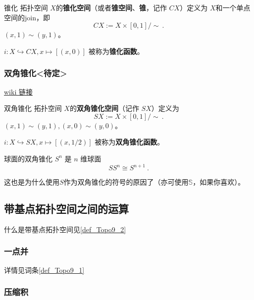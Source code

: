 \begin{definition}{锥化}
拓扑空间 $X$的\textbf{锥化空间}（或者\textbf{锥空间}、\textbf{锥}，记作 $C X$）定义为 $X$和一个单点空间的join，即
\[
    C X := X \times [0,1] / \sim~.
\]
$(x, 1) \sim (y, 1)$。

$i: X \hookrightarrow C X, x \mapsto [(x, 0)]$ 被称为\textbf{锥化函数}。
\end{definition}


\subsubsection{双角锥化<待定>}

\href{https://en.wikipedia.org/wiki/Suspension_(topology)}{wiki 链接}

\begin{definition}{双角锥化}
拓扑空间 $X$的\textbf{双角锥化空间}（记作 $S X$）定义为
\[
    S X := X \times [0,1] / \sim~.
\]
$(x, 1) \sim (y, 1), (x, 0) \sim (y, 0)$。

$i: X \hookrightarrow S X, x \mapsto [(x, 1/2)]$ 被称为\textbf{双角锥化函数}。
\end{definition}

\begin{theorem}{球面的双角锥化}
$S^n$ 是 $n$ 维球面
\[
S S^n \cong S^{n+1}~.
\]
\end{theorem}
这也是为什么使用$S$作为双角锥化的符号的原因了（亦可使用$\mathbb{S}$，如果你喜欢）。


\subsection{带基点拓扑空间之间的运算}

什么是带基点拓扑空间见\autoref{def_Topo9_2}~

\subsubsection{一点并}

详情见词条\autoref{def_Topo9_1}~


\subsubsection{压缩积}


